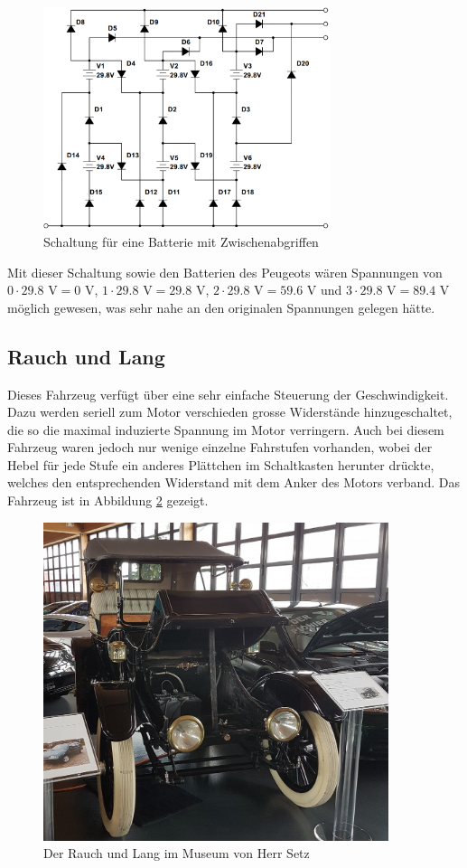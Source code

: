 \begin{figure}[h!]
	\centering
		\includegraphics[width=0.75\textwidth]{images/68.PNG}
	\caption{Schaltung für eine Batterie mit Zwischenabgriffen}
	\label{fig:68}
\end{figure}

Mit dieser Schaltung sowie den Batterien des Peugeots wären Spannungen von $0\cdot29.8$ V$=0$ V, $1\cdot29.8$ V$=29.8$ V, $2\cdot29.8$ V$=59.6$ V und $3\cdot29.8$ V$=89.4$ V möglich gewesen, was sehr nahe an den originalen Spannungen gelegen hätte.

\subsection{Rauch und Lang}
Dieses Fahrzeug verfügt über eine sehr einfache Steuerung der Geschwindigkeit. Dazu werden seriell zum Motor verschieden grosse Widerstände hinzugeschaltet, die so die maximal induzierte Spannung im Motor verringern. Auch bei diesem Fahrzeug waren jedoch nur wenige einzelne Fahrstufen vorhanden, wobei der Hebel für jede Stufe ein anderes Plättchen im Schaltkasten herunter drückte, welches den entsprechenden Widerstand mit dem Anker des Motors verband. Das Fahrzeug ist in Abbildung \ref{fig:Setz} gezeigt.

\begin{figure}[p]
	\centering
		\includegraphics[width=0.9\textwidth]{images/Setz.JPG}
	\caption{Der Rauch und Lang im Museum von Herr Setz}
	\label{fig:Setz}
\end{figure}

